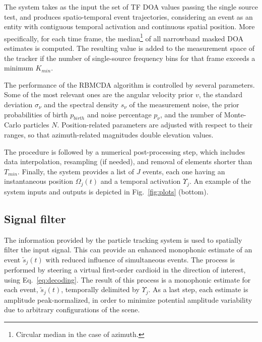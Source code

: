 The system takes as the input the set of TF DOA values passing the single source test, and produces spatio-temporal event trajectories, considering an event as an entity with contiguous temporal activation and continuous spatial position. 
More specifically, for each time frame, the median\footnote{Circular median in the case of azimuth.} of all narrowband masked DOA estimates is computed. The resulting value is added to the measurement space of the tracker if the number of single-source frequency bins for that frame exceeds a minimum $K_{min}$. 

The performance of the RBMCDA algorithm is controlled by several parameters. Some of the most relevant ones are the angular velocity prior $v$, the standard deviation $\sigma_{\nu}$ and the spectral density $s_{\nu}$ of the measurement noise, the prior probabilities of birth $p_{birth}$ and noise percentage $p_{\nu}$, and the number of Monte-Carlo particles $N$. Position-related parameters are adjusted with respect to their ranges, so that azimuth-related magnitudes double elevation values.  



The procedure is followed by a numerical post-processing step, which includes data interpolation, resampling (if needed), and removal of elements shorter than $T_{min}$.
Finally, the system provides a list of $J$ events, each one having an instantaneous position $\Omega_j(t)$ and a temporal activation $\Upsilon_j$. 
An example of the system inputs and outputs is depicted in Fig.~\ref{fig:plots} (bottom).



 
\subsection{Signal filter}

The information provided by the particle tracking system is used to spatially filter the input signal. This can provide an enhanced monophonic estimate of an event $\tilde{s}_j(t)$ with reduced influence of simultaneous events.
The process is performed by steering a virtual first-order cardioid in the direction of interest, using Eq.~\ref{eq:decoding}.
 The result of this process is a monophonic estimate for each event, $\tilde{s}_j(t)$, temporally delimited by $\Upsilon_j$. 
 As a last step, each estimate is amplitude peak-normalized, in order to minimize potential amplitude variability due to arbitrary configurations of the scene. 


